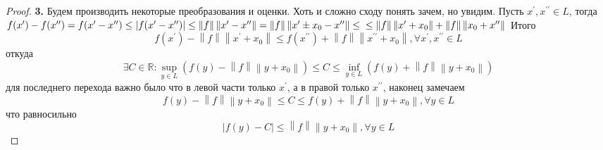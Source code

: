 \documentclass[12pt,a4paper]{article}
\theoremstyle{definition}
\newcommand{\Real}{\mathbb{R}}
\newcommand{\norm}[1]{\left\lVert#1\right\rVert}
\newcommand{\tick}[1]{#1^{\prime}}
\newcommand{\dtick}[1]{#1^{\prime\prime}}
\begin{document}
\begin{proof}
	\textbf{3.} Будем производить некоторые преобразования и оценки. Хоть и сложно сходу понять зачем, но увидим. Пусть $\tick{x}, \dtick{x} \in L$, тогда \newline\newline
	$f(\tick{x}) - f(\dtick{x}) = 
	f(\tick{x} - \dtick{x}) \leq |f(\tick{x} - \dtick{x})| \leq
	\norm{f}\norm{\tick{x} - \dtick{x}} =
	\norm{f}\norm{\tick{x} \pm x_0 - \dtick{x}} \leq \\
	\leq \norm{f}\norm{\tick{x} + x_0} + \norm{f}\norm{x_0 + \dtick{x}}$ \newline
	Итого 
	$$f(\tick{x}) - \norm{f}\norm{\tick{x} + x_0} \leq  f(\dtick{x}) + \norm{f}\norm{\dtick{x} + x_0}, \forall \tick{x},\dtick{x} \in L$$ 
	откуда
	$$\exists C \in \Real: \sup_{y \in L}{(f(y) - \norm{f}\norm{y + x_0})} \leq C \leq
	\inf_{y \in L}{(f(y) + \norm{f}\norm{y + x_0})}$$ \newline
	для последнего перехода важно было что в левой части только $\tick{x}$, а в правой только $\dtick{x}$, наконец замечаем
	$$f(y) - \norm{f}\norm{y + x_0} \leq C \leq f(y) + \norm{f}\norm{y + x_0}, \forall y \in L$$
	что равносильно
	\begin{equation}
		|f(y) - C| \leq \norm{f}\norm{y + x_0}, \forall y \in L \label{eq:1}
	\end{equation}
	\newline
	

\end{proof}
\end{document}
